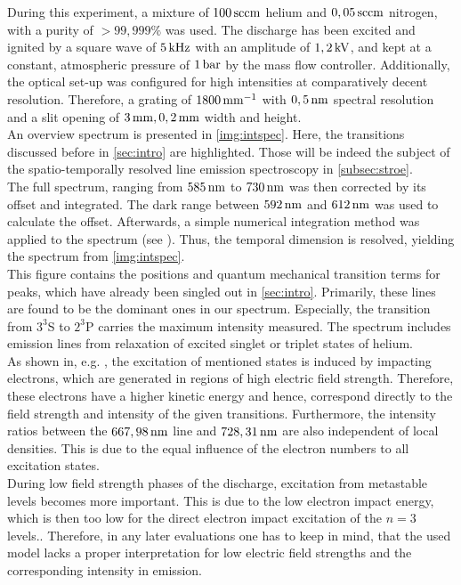 \documentclass[a4paper,10pt,twoside]{article}
\begin{document}
			During this experiment, a mixture of $\unit[100]{sccm}$ helium and $\unit[0,05]{sccm}$ nitrogen, with a purity of $>99,999\%$ was used. The discharge has been excited and ignited by a square wave of $\unit[5]{kHz}$ with an amplitude of $\unit[1,2]{kV}$, and kept at a constant, atmospheric pressure of $\unit[1]{bar}$ by the mass flow controller. Additionally, the optical set-up was configured for high intensities at comparatively decent resolution. Therefore, a grating of $\unit[1800]{mm^{-1}}$ with $\unit[0,5]{nm}$ spectral resolution and a slit opening of $\unit[3]{mm}, \unit[0,2]{mm}$ width and height.\\ 
			An overview spectrum is presented in \autoref{img:intspec}. Here, the transitions discussed before in \autoref{sec:intro} are highlighted. Those will be indeed the subject of the spatio-temporally resolved line emission spectroscopy in \autoref{subsec:stroe}.\\
			The full spectrum, ranging from $\unit[585]{nm}$ to $\unit[730]{nm}$ was then corrected by its offset and integrated. The dark range between $\unit[592]{nm}$ and $\unit[612]{nm}$ was used to calculate the offset. Afterwards, a simple numerical integration method was applied to the spectrum (see \cite{Wiki:Euler}). Thus, the temporal dimension is resolved, yielding the spectrum from \autoref{img:intspec}.\\
			This figure contains the positions and quantum mechanical transition terms for peaks, which have already been singled out in \autoref{sec:intro}. Primarily, these lines are found to be the dominant ones in our spectrum. Especially, the transition from $3^3$S to $2^3$P carries the maximum intensity measured. The spectrum includes emission lines from relaxation of excited singlet or triplet states of helium.\\
			As shown in, e.g. \cite{linratio1_14}, the excitation of mentioned states is induced by impacting electrons, which are generated in regions of high electric field strength. Therefore, these electrons have a higher kinetic energy and hence, correspond directly to the field strength and intensity of the given transitions. Furthermore, the intensity ratios between the $\unit[667,98]{nm}$ line and $\unit[728,31]{nm}$ are also independent of local densities. This is due to the equal influence of the electron numbers to all excitation states.\\
			During low field strength phases of the discharge, excitation from metastable levels becomes more important. This is due to the low electron impact energy, which is then too low for the direct electron impact excitation of the $n=3$ levels.. Therefore, in any later evaluations one has to keep in mind, that the used model lacks a proper interpretation for low electric field strengths and the corresponding intensity in emission.\\
\end{document}
